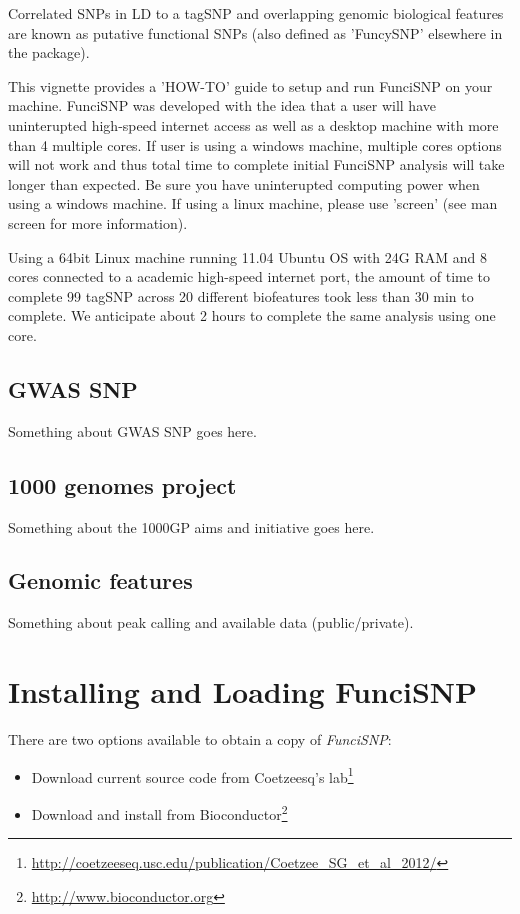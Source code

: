 \documentclass[12pt,fullpage]{article}
\newcommand{\Rpackage}[1]{{\textit{#1}}}
\begin{document}
Correlated SNPs in LD to a tagSNP and overlapping genomic biological features
are known as putative functional SNPs (also defined as 'FuncySNP' elsewhere in
the package).

This vignette provides a 'HOW-TO' guide to setup and run FunciSNP on your
machine. FunciSNP was developed with the idea that a user will have uninterupted
high-speed internet access as well as a desktop machine with  more than 4
multiple cores. If user is using a windows machine, multiple cores options will
not work and thus total time to complete initial FunciSNP analysis will take
longer than expected. Be sure you have uninterupted computing power when using a
windows machine. If using a linux machine, please use 'screen' (see man screen
for more information).

Using a 64bit Linux machine running 11.04 Ubuntu OS with 24G RAM and 8 cores
connected to a academic high-speed internet port, the amount of time to complete
99 tagSNP across 20 different biofeatures took less than 30 min to complete. We
anticipate about 2 hours to complete the same analysis using one core.

\subsection{GWAS SNP}
Something about GWAS SNP goes here.

\subsection{1000 genomes project}
Something about the 1000GP aims and initiative goes here. 

\subsection{Genomic features}
Something about peak calling and available data (public/private).

\section{Installing and Loading FunciSNP}

There are two options available to obtain a copy of \Rpackage{FunciSNP}: 

\begin{itemize}
\item Download current source code from Coetzeesq's
lab\footnote{\url{http://coetzeeseq.usc.edu/publication/Coetzee_SG_et_al_2012/}}
\item Download and install from
Bioconductor\footnote{\url{http://www.bioconductor.org}}
\end{itemize}
\end{document}
